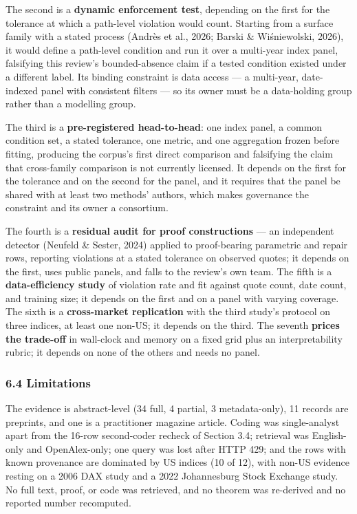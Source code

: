 \documentclass[11pt]{article}
\begin{document}
The second is a \textbf{dynamic enforcement test}, depending on the first for the tolerance at which a path-level violation would count. Starting from a surface family with a stated process (Andrès et al., 2026; Barski \& Wiśniewolski, 2026), it would define a path-level condition and run it over a multi-year index panel, falsifying this review's bounded-absence claim if a tested condition existed under a different label. Its binding constraint is data access — a multi-year, date-indexed panel with consistent filters — so its owner must be a data-holding group rather than a modelling group.

The third is a \textbf{pre-registered head-to-head}: one index panel, a common condition set, a stated tolerance, one metric, and one aggregation frozen before fitting, producing the corpus's first direct comparison and falsifying the claim that cross-family comparison is not currently licensed. It depends on the first for the tolerance and on the second for the panel, and it requires that the panel be shared with at least two methods' authors, which makes governance the constraint and its owner a consortium.

The fourth is a \textbf{residual audit for proof constructions} — an independent detector (Neufeld \& Sester, 2024) applied to proof-bearing parametric and repair rows, reporting violations at a stated tolerance on observed quotes; it depends on the first, uses public panels, and falls to the review's own team. The fifth is a \textbf{data-efficiency study} of violation rate and fit against quote count, date count, and training size; it depends on the first and on a panel with varying coverage. The sixth is a \textbf{cross-market replication} with the third study's protocol on three indices, at least one non-US; it depends on the third. The seventh \textbf{prices the trade-off} in wall-clock and memory on a fixed grid plus an interpretability rubric; it depends on none of the others and needs no panel.

\subsubsection*{6.4 Limitations}
The evidence is abstract-level (34 full, 4 partial, 3 metadata-only), 11 records are preprints, and one is a practitioner magazine article. Coding was single-analyst apart from the 16-row second-coder recheck of Section 3.4; retrieval was English-only and OpenAlex-only; one query was lost after HTTP 429; and the rows with known provenance are dominated by US indices (10 of 12), with non-US evidence resting on a 2006 DAX study and a 2022 Johannesburg Stock Exchange study. No full text, proof, or code was retrieved, and no theorem was re-derived and no reported number recomputed.
\end{document}

